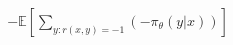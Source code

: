 \documentclass[preview]{standalone}
\begin{document}
\begin{align*}
-\mathbb{E}\left[\sum_{y:r(x,y)=-1}(-\pi_\theta(y|x))\right]
\end{align*}
\end{document}

